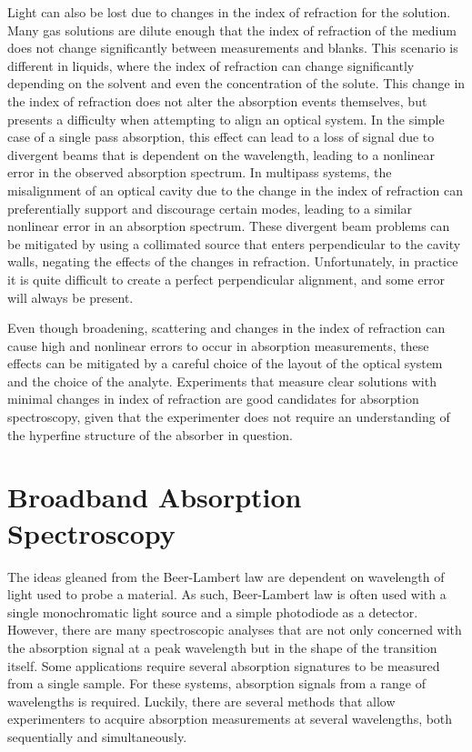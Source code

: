 Light can also be lost due to changes in the index of refraction for the
solution. Many gas solutions are dilute enough that the index of refraction of
the medium does not change significantly between measurements and blanks. This
scenario is different in liquids, where the index of refraction can change
significantly depending on the solvent and even the concentration of the
solute. This change in the index of refraction does not alter the absorption
events themselves, but presents a difficulty when attempting to align an
optical system. In the simple case of a single pass absorption, this effect can
lead to a loss of signal due to divergent beams that is dependent on the
wavelength, leading to a nonlinear error in the observed absorption spectrum.
In multipass systems, the misalignment of an optical cavity due to the change
in the index of refraction can preferentially support and discourage certain
modes, leading to a similar nonlinear error in an absorption spectrum. These
divergent beam problems can be mitigated by using a collimated source that
enters perpendicular to the cavity walls, negating the effects of the changes
in refraction. Unfortunately, in practice it is quite difficult to create a
perfect perpendicular alignment, and some error will always be present.

Even though broadening, scattering and changes in the index of refraction can
cause high and nonlinear errors to occur in absorption measurements, these
effects can be mitigated by a careful choice of the layout of the optical
system and the choice of the analyte. Experiments that measure clear solutions
with minimal changes in index of refraction are good candidates for absorption
spectroscopy, given that the experimenter does not require an understanding of
the hyperfine structure of the absorber in question.



\section{Broadband Absorption Spectroscopy}\label{sec:broad_abs}

The ideas gleaned from the Beer-Lambert law are dependent on wavelength of
light used to probe a material. As such, Beer-Lambert law is often used with a
single monochromatic light source and a simple photodiode as a detector.
However, there are many spectroscopic analyses that are not only concerned with
the absorption signal at a peak wavelength but in the shape of the transition
itself. Some applications require several absorption signatures to be measured
from a single sample. For these systems, absorption signals from a range of
wavelengths is required. Luckily, there are several methods that allow
experimenters to acquire absorption measurements at several wavelengths, both
sequentially and simultaneously.



